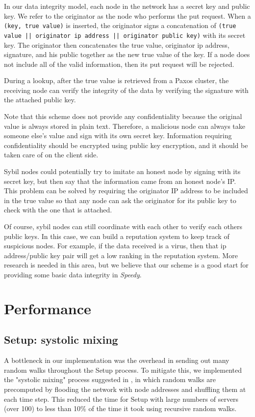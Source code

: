 \documentclass[letter]{article}
\newcommand{\sys}{\textit{Speedy}\space}
\begin{document}
In our data integrity model,
each node in the network has a secret key and public key. We refer to the originator as the node who performs the put request. When a \texttt{(key, true value)} is inserted, the originator signs a concatenation of \texttt{(true value || originator ip address || originator public key)} with its secret key.
The originator then concatenates the true value, originator ip address, signature, and his public together as the new true value of the key.
If a node does not include all of the valid information, then its put request will be rejected.

During a lookup, after the true value is retrieved from a Paxos cluster, the receiving node can verify the integrity of the data by verifying the signature with the attached public key.

Note that this scheme does not provide any confidentiality because the original value
is always stored in plain text. Therefore, a malicious node can always take someone else's value and sign with its own secret key. Information requiring confidentiality should be
encrypted using public key encryption, and it should be taken care of on the client side.

Sybil nodes could potentially try to imitate an honest node by signing with its secret key,
but then say that the information came from an honest node's IP. This problem can be solved by
requiring the originator IP address to be included in the true value so that any node can ask the originator for its public key to check with the one that is attached.

Of course, sybil nodes can still coordinate with each other to verify each others public keys. In this case, we can build a reputation system to keep track of suspicious nodes. For example, if the data received is a virus, then that ip address/public key pair will get a low ranking in the reputation system. More research is needed in this area, but we believe that our scheme is a good start for providing some basic data integrity in \sys.

\section{Performance}

\subsection{Setup: systolic mixing}

A bottleneck in our implementation was the overhead in sending out many random
walks throughout the Setup process. To mitigate this, we implemented the "systolic
mixing" process suggested in \cite{whanauthesis}, in which random walks are
precomputed by flooding the network with node addresses and shuffling them at each
time step. This reduced the time for Setup with large numbers of servers (over 100)
to less than 10\% of the time it took using recursive random walks.
\end{document}
